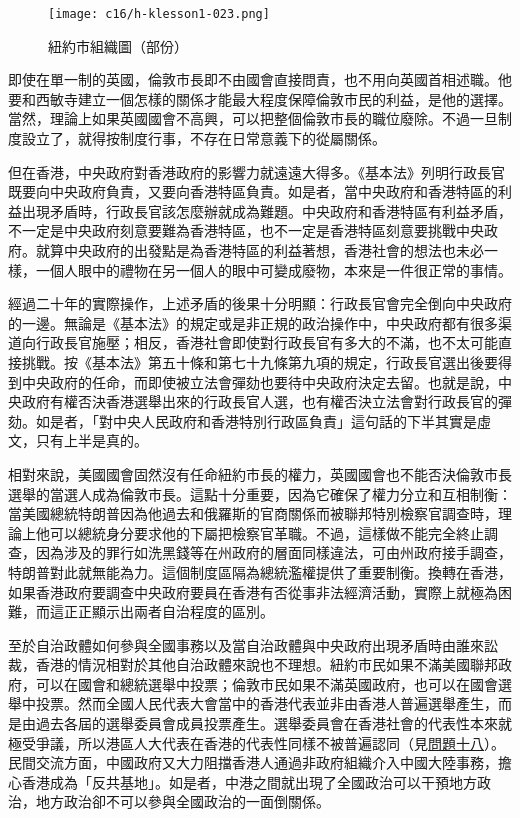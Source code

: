 \begin{figure}[htbp]
    \centering
    \texttt{[image: c16/h-klesson1-023.png]}
    \caption{紐約市組織圖（部份）} 
\end{figure}

即使在單一制的英國，倫敦市長即不由國會直接問責，也不用向英國首相述職。他要和西敏寺建立一個怎樣的關係才能最大程度保障倫敦市民的利益，是他的選擇。當然，理論上如果英國國會不高興，可以把整個倫敦市長的職位廢除。不過一旦制度設立了，就得按制度行事，不存在日常意義下的從屬關係。

但在香港，中央政府對香港政府的影響力就遠遠大得多。《基本法》列明行政長官既要向中央政府負責，又要向香港特區負責。如是者，當中央政府和香港特區的利益出現矛盾時，行政長官該怎麼辦就成為難題。中央政府和香港特區有利益矛盾，不一定是中央政府刻意要難為香港特區，也不一定是香港特區刻意要挑戰中央政府。就算中央政府的出發點是為香港特區的利益著想，香港社會的想法也未必一樣，一個人眼中的禮物在另一個人的眼中可變成廢物，本來是一件很正常的事情。

經過二十年的實際操作，上述矛盾的後果十分明顯：行政長官會完全倒向中央政府的一邊。無論是《基本法》的規定或是非正規的政治操作中，中央政府都有很多渠道向行政長官施壓；相反，香港社會即使對行政長官有多大的不滿，也不太可能直接挑戰。按《基本法》第五十條和第七十九條第九項的規定，行政長官選出後要得到中央政府的任命，而即使被立法會彈劾也要待中央政府決定去留。也就是說，中央政府有權否決香港選舉出來的行政長官人選，也有權否決立法會對行政長官的彈劾。如是者，「對中央人民政府和香港特別行政區負責」這句話的下半其實是虛文，只有上半是真的。

相對來說，美國國會固然沒有任命紐約市長的權力，英國國會也不能否決倫敦市長選舉的當選人成為倫敦市長。這點十分重要，因為它確保了權力分立和互相制衡：當美國總統特朗普因為他過去和俄羅斯的官商關係而被聯邦特別檢察官調查時，理論上他可以總統身分要求他的下屬把檢察官革職。不過，這樣做不能完全終止調查，因為涉及的罪行如洗黑錢等在州政府的層面同樣違法，可由州政府接手調查，特朗普對此就無能為力。這個制度區隔為總統濫權提供了重要制衡。換轉在香港，如果香港政府要調查中央政府要員在香港有否從事非法經濟活動，實際上就極為困難，而這正正顯示出兩者自治程度的區別。

至於自治政體如何參與全國事務以及當自治政體與中央政府出現矛盾時由誰來訟裁，香港的情況相對於其他自治政體來說也不理想。紐約市民如果不滿美國聯邦政府，可以在國會和總統選舉中投票；倫敦市民如果不滿英國政府，也可以在國會選舉中投票。然而全國人民代表大會當中的香港代表並非由香港人普遍選舉產生，而是由過去各屆的選舉委員會成員投票產生。選舉委員會在香港社會的代表性本來就極受爭議，所以港區人大代表在香港的代表性同樣不被普遍認同（見\hyperref[sec:sec18]{問題十八}）。民間交流方面，中國政府又大力阻擋香港人通過非政府組織介入中國大陸事務，擔心香港成為「反共基地」。如是者，中港之間就出現了全國政治可以干預地方政治，地方政治卻不可以參與全國政治的一面倒關係。

